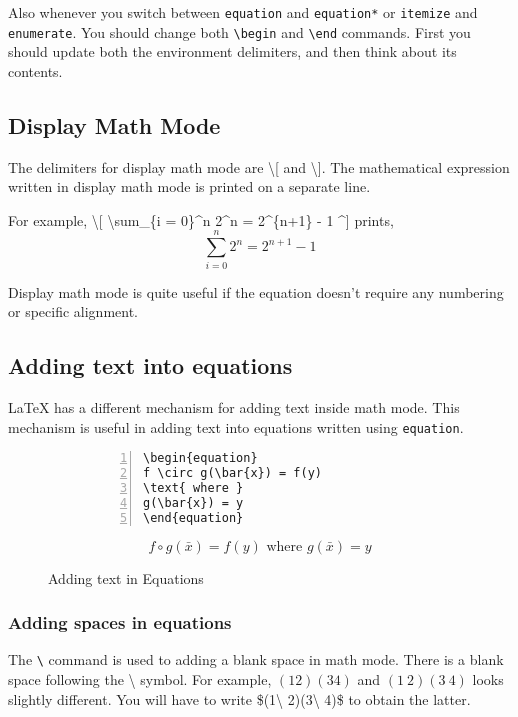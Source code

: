\documentclass{article}
\begin{document}
	Also whenever you switch between \texttt{equation} and \texttt{equation*} or \texttt{itemize} and \texttt{enumerate}. You should change both \texttt{\textbackslash begin} and \texttt{\textbackslash end} commands. First you should update both the environment delimiters, and then think about its contents.

\subsection{Display Math Mode}
	The delimiters for display math mode are \textbackslash[ and \textbackslash]. The mathematical expression written in display math mode is printed on a separate line.
	
	For example, \textbackslash[ \textbackslash sum\_\{i = 0\}\textasciicircum n 2\textasciicircum n = 2\textasciicircum\{n+1\} - 1 \textasciicircum] prints, \[ \sum_{i = 0}^n 2^n = 2^{n+1} - 1 \]

	Display math mode is quite useful if the equation doesn't require any numbering or specific alignment.

\subsection{Adding text into equations}
	\LaTeX{} has a different mechanism for adding text inside math mode. This mechanism is useful in adding text into equations written using \texttt{equation}.

\begin{figure}[h]
\centering
\begin{subfigure}{0.45\textwidth}
\begin{Verbatim}[numbers = left]
\begin{equation}
f \circ g(\bar{x}) = f(y)
\text{ where }
g(\bar{x}) = y
\end{equation}
\end{Verbatim}
\end{subfigure}
\begin{subfigure}{0.45\textwidth}
\begin{equation}
f \circ g(\bar{x}) = f(y)
\text{ where }
g(\bar{x}) = y
\end{equation}
\end{subfigure} 
\caption{Adding text in Equations}
\label{fig:textAndEquation}
\end{figure}

\subsubsection{Adding spaces in equations}
	The \texttt{\textbackslash } command is used to adding a blank space in math mode. There is a blank space following the \textbackslash{} symbol. For example, $(1 2)(3 4)$ and $(1\ 2)(3\ 4)$ looks slightly different. You will have to write \$(1\textbackslash{} 2)(3\textbackslash{} 4)\$ to obtain the latter.
\end{document}
